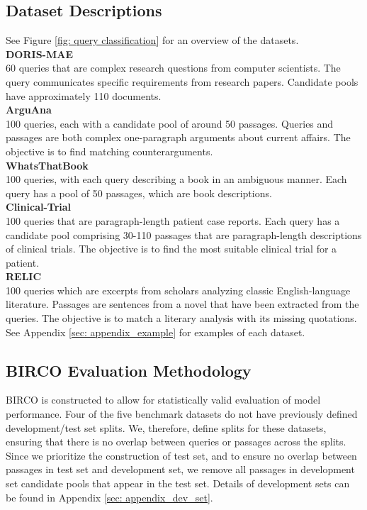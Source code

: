 \documentclass[11pt]{article}
\begin{document}
\subsection{Dataset Descriptions}
See Figure \ref{fig: query classification} for an overview of the datasets.\\
\textbf{DORIS-MAE} \cite{dorismae}\\
60 queries that are complex research questions from computer scientists. The query communicates specific requirements from research papers. Candidate pools have approximately 110 documents.  \\
\textbf{ArguAna} \cite{arguana}\\
100 queries, each with a candidate pool of around 50 passages. Queries and passages are both complex one-paragraph arguments about current affairs. The objective is to find matching counterarguments. \\
\textbf{WhatsThatBook} \cite{wtb}\\
100 queries, with each query describing a book in an ambiguous manner. Each query has a pool of 50 passages, which are book descriptions.\\
\textbf{Clinical-Trial} \cite{clinical-trial}\\
100 queries that are paragraph-length patient case reports. Each query has a candidate pool comprising 30-110 passages that are paragraph-length descriptions of clinical trials. The objective is to find the most suitable clinical trial for a patient. \\
\textbf{RELIC} \cite{relic}\\
100 queries which are excerpts from scholars analyzing classic English-language literature. Passages are sentences from a novel that have been extracted from the queries. The objective is to match a literary analysis with its missing quotations.
See Appendix \ref{sec: appendix_example} for examples of each dataset.

\subsection{BIRCO Evaluation Methodology}
BIRCO is constructed to allow for statistically valid evaluation of model performance. Four of the five benchmark datasets do not have previously defined development/test set splits. We, therefore, define splits for these datasets, ensuring that there is no overlap between queries or passages across the splits. Since we prioritize the construction of test set, and to ensure no overlap between passages in test set and development set, we remove all passages in development set candidate pools that appear in the test set. Details of development sets can be found in Appendix \ref{sec: appendix_dev_set}.
\end{document}
